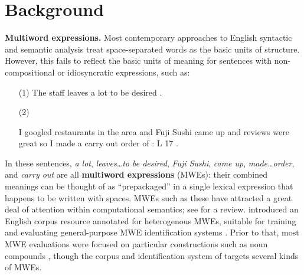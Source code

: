 \documentclass[11pt,letterpaper]{article}
\newcommand{\lex}[1]{\textit{#1}} %
\begin{document}


\section{Background}\label{sec:integration}
\textbf{Multiword expressions.} 
Most contemporary approaches to English syntactic and semantic analysis
treat space-separated words as the basic units of structure. 
However, this fails to reflect 
the basic units of meaning for sentences with non-compositional or idiosyncratic expressions, such as:
\begin{itemize}[labelindent=2em]
\item[(1)] The staff {\color{red}leaves} {\color{blue}a lot} {\color{red}to be desired} .
\item[(2)] \raggedright I googled restaurants in the area and {\color{red}Fuji Sushi} {\color{blue}came up} and reviews were great so I {\color{mdgreen}made a} {\color{orange}carry out} {\color{mdgreen}order} of : L 17 .
\end{itemize}
In these sentences, \lex{a lot}, \lex{leaves\ldots to be desired}, 
\lex{Fuji Sushi}, \lex{came up}, \lex{made\ldots order}, and \lex{carry out}
are all \textbf{multiword expressions} (MWEs): their combined meanings can be thought of as ``prepackaged'' 
in a single lexical expression that happens to be written with spaces.
MWEs such as these have attracted a great deal of attention 
within computational semantics; see \citet{baldwin-10} for a review.
 introduced an English corpus resource annotated for heterogenous MWEs, 
suitable for training and evaluating general-purpose MWE identification systems \citep{schneider-14}.
Prior to that, most MWE evaluations were focused on particular constructions such as noun compounds \citep[recently:][]{constant-11,green-12,ramisch-12,vincze-13},
though the corpus and identification system of \citet{vincze-11} targets several kinds of MWEs.
\end{document}
